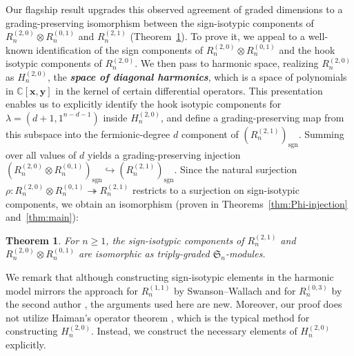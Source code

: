 \documentclass[11pt, noadjust, reqno]{amsart}
\newtheorem{introthm}{Theorem}
\theoremstyle{definition}
\theoremstyle{remark}
\numberwithin{equation}{section}
\newcommand{\0}{\emptyset}
\newcommand{\C}{\mathbb{C}}
\renewcommand{\S}{\mathfrak{S}}
\DeclareMathOperator{\sgn}{sgn}
\newcommand{\newword}[1]{\emph{\textbf{#1}}}
\begin{document}
Our flagship result upgrades this observed agreement of graded dimensions to a grading-preserving isomorphism between the sign-isotypic components of $R_n^{(2,0)} \otimes R_n^{(0,1)}$ and $R_n^{(2,1)}$ (Theorem~\ref{introthm:main}). 
To prove it, we appeal to a well-known identification of the sign components of $R_n^{(2,0)} \otimes R_n^{(0,1)}$ and the hook isotypic components of $R_n^{(2,0)}$. 
We then pass to harmonic space, realizing $R_n^{(2,0)}$ as $H_n^{(2,0)}$, the \newword{space of diagonal harmonics}, which is a space of polynomials in $\C[\bm{x},\bm{y}]$ in the kernel of certain differential operators. This presentation enables us to explicitly identify the hook isotypic components for $\lambda = (d+1,1^{n-d-1})$ inside $H_n^{(2,0)}$, and define a grading-preserving map from this subspace into the fermionic-degree $d$ component of $(R_n^{(2,1)})_{\sgn}$. 
Summing over all values of $d$ yields a grading-preserving injection $(R_n^{(2,0)} \otimes R_n^{(0,1)})_{\sgn} \hookrightarrow(R_n^{(2,1)})_{\sgn}$.  Since the natural surjection $\rho: R_n^{(2,0)} \otimes R_n^{(0,1)} \twoheadrightarrow R_n^{(2,1)}$ restricts to a surjection on sign-isotypic components, we obtain an isomorphism (proven in Theorems~\ref{thm:Phi-injection} and~\ref{thm:main}):
\begin{introthm}\label{introthm:main}
    For $n\geq 1$, the sign-isotypic components of $R_n^{(2,1)}$ and $R_n^{(2,0)} \otimes R_n^{(0,1)}$ are isomorphic as triply-graded $\S_n$-modules.
\end{introthm}
\noindent We remark that although constructing sign-isotypic elements in the harmonic model mirrors the approach for $R_n^{(1,1)}$ by Swanson--Wallach \cite{SwansonWallach1} and for $R_n^{(0,3)}$ by the second author \cite{Lentfer2025}, the arguments used here are new. Moreover, our proof does not utilize Haiman's operator theorem \cite{Haiman1994,Haiman2002}, which is the typical method for constructing $H_n^{(2,0)}$. 
Instead, we construct the necessary elements of $H_n^{(2,0)}$ explicitly.
\end{document}
